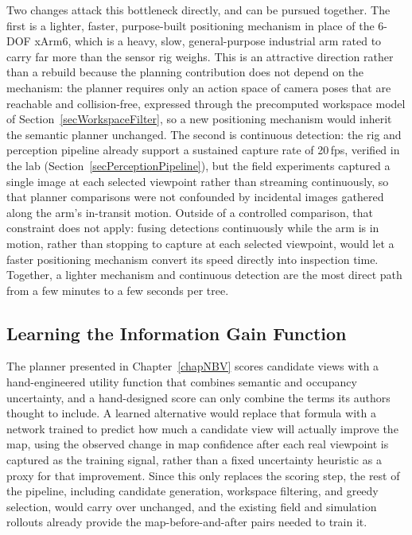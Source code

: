 Two changes attack this bottleneck directly, and can be pursued together.
The first is a lighter, faster, purpose-built positioning mechanism in
place of the 6-DOF xArm6, which is a heavy, slow, general-purpose
industrial arm rated to carry far more than the sensor rig weighs.
This is an attractive direction rather than a rebuild because the
planning contribution does not depend on the mechanism: the planner
requires only an action space of camera poses that are reachable and
collision-free, expressed through the precomputed workspace model of
Section~\ref{secWorkspaceFilter}, so a new positioning mechanism would
inherit the semantic planner unchanged.
The second is continuous detection: the rig and perception pipeline
already support a sustained capture rate of 20\,fps, verified in the lab
(Section~\ref{secPerceptionPipeline}), but the field experiments
captured a single image at each selected viewpoint rather than streaming
continuously, so that planner comparisons were not confounded by
incidental images gathered along the arm's in-transit motion.
Outside of a controlled comparison, that constraint does not apply:
fusing detections continuously while the arm is in motion, rather than
stopping to capture at each selected viewpoint, would let a faster
positioning mechanism convert its speed directly into inspection time.
Together, a lighter mechanism and continuous detection are the most
direct path from a few minutes to a few seconds per tree.

\subsection{Learning the Information Gain Function} \label{secFutureLearnedPolicy}

The planner presented in Chapter~\ref{chapNBV} scores candidate views
with a hand-engineered utility function that combines semantic and
occupancy uncertainty, and a hand-designed score can only combine the
terms its authors thought to include.
A learned alternative would replace that formula with a network trained
to predict how much a candidate view will actually improve the map,
using the observed change in map confidence after each real viewpoint
is captured as the training signal, rather than a fixed uncertainty
heuristic as a proxy for that improvement.
Since this only replaces the scoring step, the rest of the pipeline,
including candidate generation, workspace filtering, and greedy
selection, would carry over unchanged, and the existing field and
simulation rollouts already provide the map-before-and-after pairs
needed to train it.

